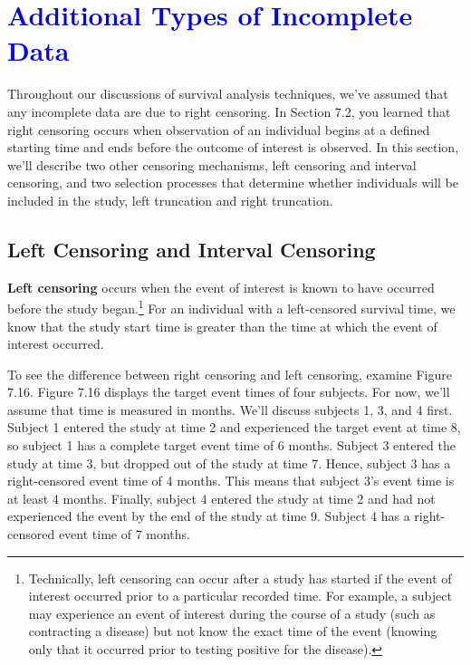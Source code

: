 \documentclass[
]{report}
\begin{document}
\hypertarget{section-86}{%
\section{\texorpdfstring{\textcolor{blue}{Additional Types of Incomplete Data}}{}}\label{section-86}}

Throughout our discussions of survival analysis techniques, we've assumed that any incomplete data are due to right censoring. In Section 7.2, you learned that right censoring occurs when observation of an individual begins at a defined starting time and ends before the outcome of interest is observed. In this section, we'll describe two other censoring mechanisms, left censoring and interval censoring, and two selection processes that determine whether individuals will be included in the study, left truncation and right truncation.

\hypertarget{left-censoring-and-interval-censoring}{%
\subsection*{Left Censoring and Interval Censoring}\label{left-censoring-and-interval-censoring}}

\textbf{Left censoring} occurs when the event of interest is known to have occurred before the study began.\footnote{Technically, left censoring can occur after a study has started if the event of interest occurred prior to a particular recorded time. For example, a subject may experience an event of interest during the course of a study (such as contracting a disease) but not know the exact time of the event (knowing only that it occurred prior to testing positive for the disease).} For an individual with a left-censored survival time, we know that the study start time is greater than the time at which the event of interest occurred.

To see the difference between right censoring and left censoring, examine Figure 7.16. Figure 7.16 displays the target event times of four subjects. For now, we'll assume that time is measured in months. We'll discuss subjects 1, 3, and 4 first. Subject 1 entered the study at time 2 and experienced the target event at time 8, so subject 1 has a complete target event time of 6 months. Subject 3 entered the study at time 3, but dropped out of the study at time 7. Hence, subject 3 has a right-censored event time of 4 months. This means that subject 3's event time is at least 4 months. Finally, subject 4 entered the study at time 2 and had not experienced the event by the end of the study at time 9. Subject 4 has a right-censored event time of 7 months.
\end{document}
